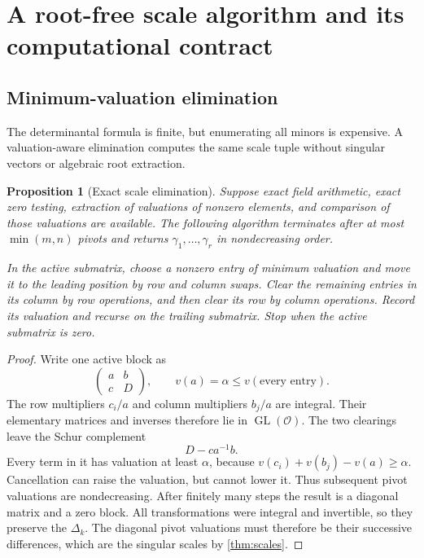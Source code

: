 \documentclass[11pt,a4paper]{article}
\numberwithin{equation}{section}
\newtheorem{proposition}[proposition]{Proposition}
\theoremstyle{definition}
\theoremstyle{remark}
\newcommand{\OO}{\mathcal O}
\newcommand{\GL}{\operatorname{GL}}
\begin{document}
\section{A root-free scale algorithm and its computational contract}\label{sec:algorithm}

\subsection{Minimum-valuation elimination}
The determinantal formula is finite, but enumerating all minors is
expensive. A valuation-aware elimination computes the same scale tuple
without singular vectors or algebraic root extraction.

\begin{proposition}[Exact scale elimination]\label{prop:elimination}
Suppose exact field arithmetic, exact zero testing, extraction of valuations
of nonzero elements, and comparison of those valuations are available. The following algorithm
terminates after at most $\min(m,n)$ pivots and returns
$\gamma_1,\ldots,\gamma_r$ in nondecreasing order.

In the active submatrix, choose a nonzero entry of minimum valuation and
move it to the leading position by row and column swaps. Clear the remaining
entries in its column by row operations, and then clear its row by column
operations. Record its valuation and recurse on the trailing submatrix.
Stop when the active submatrix is zero.
\end{proposition}
\begin{proof}
Write one active block as
\[
 \begin{pmatrix}a&b\\c&D\end{pmatrix},\qquad
 v(a)=\alpha\le v(\text{every entry}).
\]
The row multipliers $c_i/a$ and column multipliers $b_j/a$ are integral.
Their elementary matrices and inverses therefore lie in $\GL(\OO)$.
The two clearings leave the Schur complement
\begin{equation}\label{eq:eliminationSchur}
 D-ca^{-1}b.
\end{equation}
Every term in it has valuation at least $\alpha$, because
$v(c_i)+v(b_j)-v(a)\ge\alpha$. Cancellation can raise the valuation, but
cannot lower it. Thus subsequent pivot valuations are nondecreasing.
After finitely many steps the result is a diagonal matrix and a zero block.
All transformations were integral and invertible, so they preserve the
$\Delta_k$. The diagonal pivot valuations must therefore be their successive
differences, which are the singular scales by \cref{thm:scales}.
\end{proof}
\end{document}
